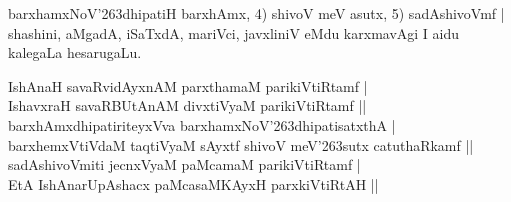 \begin{entry}
{{barxhamxNoV{\char'263}dhipatiH barxhAmx, 4) shivoV meV asutx, 5) sadA\-shivoVmf | shashini,
aMgadA, iSaTxdA, mariVci, javxliniV eMdu karxmavAgi I aidu kalegaLa hesarugaLu.}}
\smallskip
\begin{shl}
IshAnaH savaRvidAyxnAM parxthamaM parikiVtiRtamf |\\[1pt]
IshavxraH savaRBUtAnAM divxtiVyaM parikiVtiRtamf ||\\[4pt]
barxhAmxdhipatiriteyxVva barxhamxNoV{\char'263}dhipatisatxthA |\\[1pt]
barxhemxVtiVdaM taqtiVyaM sAyxtf shivoV meV{\char'263}sutx catuthaRkamf ||\\[4pt]
sadAshivoVmiti jecnxVyaM paMcamaM parikiVtiRtamf |\\[1pt]
EtA IshAnarUpAshacx paMcasaMKAyxH parxkiVtiRtAH ||
\end{shl}
\medskip
{}
\end{entry}

